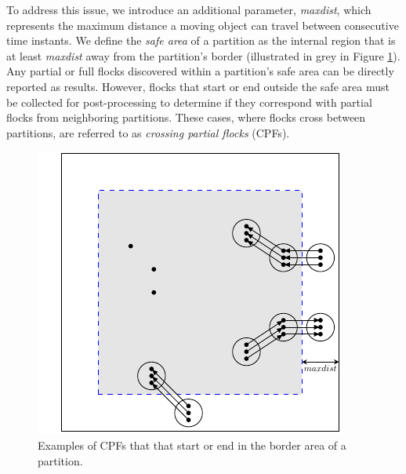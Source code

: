 To address this issue, we introduce an additional parameter, \textit{maxdist}, which represents the maximum distance a moving object can travel between consecutive time instants. We define the \textit{safe area} of a partition as the internal region that is at least \textit{maxdist} away from the partition’s border (illustrated in grey in Figure \ref{fig:maxdist}). Any partial or full flocks discovered within a partition’s safe area can be directly reported as results. However, flocks that start or end outside the safe area must be collected for post-processing to determine if they correspond with partial flocks from neighboring partitions. These cases, where flocks cross between partitions, are referred to as \textit{crossing partial flocks} (CPFs).

\begin{figure}
    \centering
    \includegraphics[width=0.5\linewidth]{chapter4/figures/maxdist.pdf}
    \caption{Examples of CPFs that that start or end in the border area of a partition.}\label{fig:maxdist}
\end{figure}


